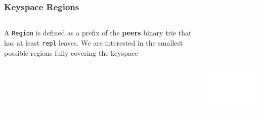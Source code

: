 \documentclass{../pl-slide}
\begin{document}
\begin{frame}
\frametitle{Keyspace Regions}

\begin{columns}[onlytextwidth]
	\begin{column}{0.39\textwidth}
		\begin{itemize}
			\itemc A \texttt{Region} is defined as a prefix of the \textbf{peers} binary trie that has at least \texttt{repl} leaves.
			\itemc We are interested in the smallest possible regions fully covering the keyspace
		\end{itemize}
	\end{column}
	\begin{column}{0.59\textwidth}
    		\begin{center}
        		\includegraphics[height=17em]{resources/trie-compressed.png}
    		\end{center}
	\end{column}
\end{columns}

\end{frame}
\end{document}

